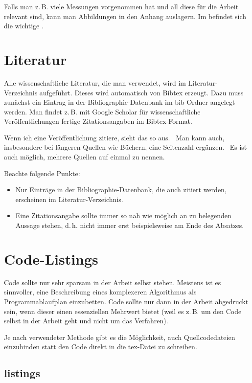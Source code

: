 Falls man z.\,B. viele Messungen vorgenommen hat und all diese für die Arbeit relevant sind, kann man Abbildungen in den Anhang auslagern.
Im  befindet sich die wichtige .

\section{Literatur}
Alle wissenschaftliche Literatur, die man verwendet, wird im Literatur-Verzeichnis aufgeführt.
Dieses wird automatisch von Bibtex erzeugt.
Dazu muss zunächst ein Eintrag in der Bibliographie-Datenbank im bib-Ordner angelegt werden.
Man findet z.\,B. mit Google Scho\-lar für wissenschaftliche Veröffentlichungen fertige Zitationsangaben im Bibtex-Format.

Wenn ich eine Veröffentlichung zitiere, sieht das so aus.~\cite{Krauthoff2017a}
Man kann auch, insbesondere bei längeren Quellen wie Büchern, eine Seitenzahl ergänzen.~\cite[S.~5]{Krauthoff2017a}
Es ist auch möglich, mehrere Quellen auf einmal zu nennen.\cite{Krauthoff2017a,dun:j:argument-acceptability}

Beachte folgende Punkte:
\begin{itemize}
    \item Nur Einträge in der Bibliographie-Datenbank, die auch zitiert werden, erscheinen im Literatur-Verzeichnis.
    \item Eine Zitationsangabe sollte immer so nah wie möglich an zu belegenden Aussage stehen, d.\,h. nicht immer erst beispielsweise am Ende des Absatzes.
\end{itemize}

\section{Code-Listings}

Code sollte nur sehr sparsam in der Arbeit selbst stehen.
Meistens ist es sinnvoller, eine Beschreibung eines komplexeren Algorithmus als Programmablaufplan einzubetten.
Code sollte nur dann in der Arbeit abgedruckt sein, wenn dieser einen essenziellen Mehrwert bietet (weil es z.\,B. um den Code selbst in der Arbeit geht und nicht um das Verfahren).

Je nach verwendeter Methode gibt es die Möglichkeit, auch Quellcodedateien einzubinden statt den Code direkt in die tex-Datei zu schreiben.

\subsection{listings}

